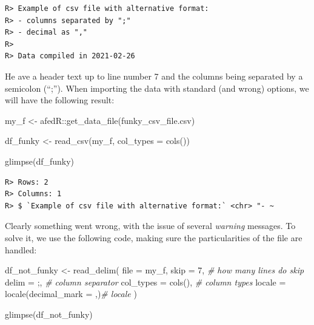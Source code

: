 \documentclass[
  12pt,
]{book}
\newenvironment{Shaded}{\begin{snugshade}}{\end{snugshade}}
\newcommand{\AttributeTok}[1]{\textcolor[rgb]{0.61,0.61,0.61}{#1}}
\newcommand{\CommentTok}[1]{\textcolor[rgb]{0.37,0.37,0.37}{\textit{#1}}}
\newcommand{\DecValTok}[1]{\textcolor[rgb]{0.06,0.06,0.06}{#1}}
\newcommand{\FunctionTok}[1]{\textcolor[rgb]{0,0,0}{#1}}
\newcommand{\NormalTok}[1]{#1}
\newcommand{\OtherTok}[1]{\textcolor[rgb]{0.37,0.37,0.37}{#1}}
\newcommand{\SpecialCharTok}[1]{\textcolor[rgb]{0,0,0}{#1}}
\newcommand{\StringTok}[1]{\textcolor[rgb]{0.5,0.5,0.5}{#1}}
\begin{document}
\begin{verbatim}
R> Example of csv file with alternative format:
R> - columns separated by ";"
R> - decimal as ","
R> 
R> Data compiled in 2021-02-26
\end{verbatim}

He ave a header text up to line number 7 and the columns being separated by a semicolon (``;''). When importing the data with standard (and wrong) options, we will have the following result:

\begin{Shaded}
\begin{Highlighting}[]
\NormalTok{my\_f }\OtherTok{\textless{}{-}}\NormalTok{ afedR}\SpecialCharTok{::}\FunctionTok{get\_data\_file}\NormalTok{(}\StringTok{\textquotesingle{}funky\_csv\_file.csv\textquotesingle{}}\NormalTok{)}

\NormalTok{df\_funky }\OtherTok{\textless{}{-}} \FunctionTok{read\_csv}\NormalTok{(my\_f, }
                     \AttributeTok{col\_types =} \FunctionTok{cols}\NormalTok{())}

\FunctionTok{glimpse}\NormalTok{(df\_funky)}
\end{Highlighting}
\end{Shaded}

\begin{verbatim}
R> Rows: 2
R> Columns: 1
R> $ `Example of csv file with alternative format:` <chr> "- ~
\end{verbatim}

Clearly something went wrong, with the issue of several \emph{warning} messages. To solve it, we use the following code, making sure the particularities of the file are handled:

\begin{Shaded}
\begin{Highlighting}[]
\NormalTok{df\_not\_funky }\OtherTok{\textless{}{-}} \FunctionTok{read\_delim}\NormalTok{(}
        \AttributeTok{file =}\NormalTok{ my\_f, }
        \AttributeTok{skip =} \DecValTok{7}\NormalTok{, }\CommentTok{\# how many lines do skip}
        \AttributeTok{delim =} \StringTok{\textquotesingle{};\textquotesingle{}}\NormalTok{, }\CommentTok{\# column separator}
        \AttributeTok{col\_types =} \FunctionTok{cols}\NormalTok{(), }\CommentTok{\# column types}
        \AttributeTok{locale =} \FunctionTok{locale}\NormalTok{(}\AttributeTok{decimal\_mark =} \StringTok{\textquotesingle{},\textquotesingle{}}\NormalTok{)}\CommentTok{\# locale}
\NormalTok{)}

\FunctionTok{glimpse}\NormalTok{(df\_not\_funky)}
\end{Highlighting}
\end{Shaded}
\end{document}
